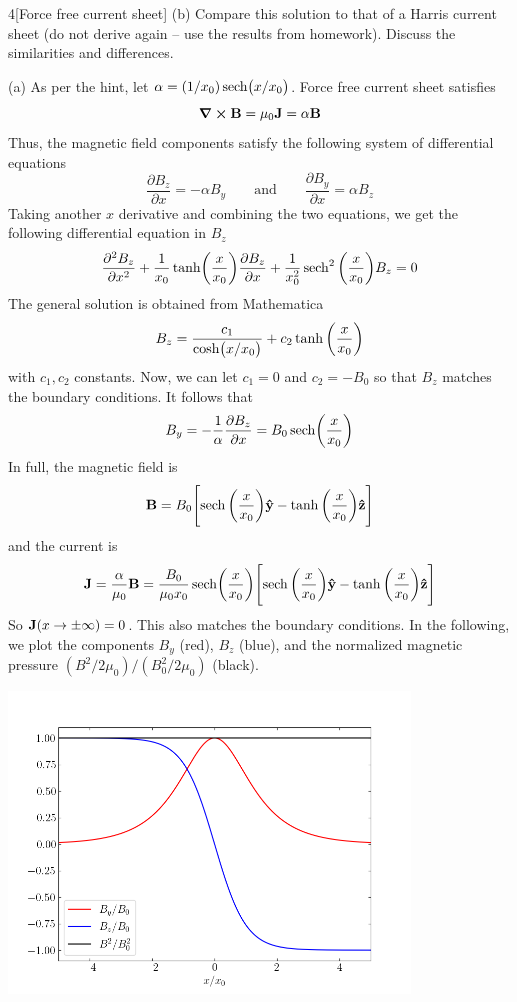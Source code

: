 \documentclass[12pt]{article}
\begin{document}
\begin{problem}{4}[Force free current sheet]
(b) Compare this solution to that of a Harris current sheet (do not derive again
-- use the results from homework). Discuss the similarities and differences.
\begin{solution}
(a) As per the hint, let $\alpha=(1/x_0)\sech(x/x_0)$. Force free current sheet
satisfies
\begin{equation}
    \curl{\vb{B}}=\mu_0\vb{J}=\alpha\vb{B} 
\end{equation}
Thus, the magnetic field components satisfy the following system of differential
equations
\begin{equation}
    \frac{\partial B_z}{\partial x}=-\alpha B_y\qquad\text{and}\qquad
    \frac{\partial B_y}{\partial x}=\alpha B_z
\end{equation}
Taking another $x$ derivative and combining the two equations, we get the
following differential equation in $B_z$
\begin{equation}
    \frac{\partial^2B_z}{\partial
    x^2}+\frac1{x_0}\tanh(\frac{x}{x_0})\frac{\partial B_z}{\partial
x}+\frac1{x_0^2}\sech^2\qty(\frac{x}{x_0})B_z=0 
\end{equation}
The general solution is obtained from Mathematica
\begin{equation}
    B_z=\frac{c_1}{\cosh(x/x_0)}+c_2\tanh\qty(\frac{x}{x_0}) 
\end{equation}
with $c_1,c_2$ constants. Now, we can let $c_1=0$ and $c_2=-B_0$ so that $B_z$
matches the boundary conditions. It follows that
\begin{equation}
    B_y=-\frac1{\alpha}\frac{\partial B_z}{\partial x}=B_0\sech(\frac{x}{x_0}) 
\end{equation}
In full, the magnetic field is
\begin{equation}
    \vb{B}=B_0\qty[\sech\qty(\frac{x}{x_0})\yhat-\tanh\qty(\frac{x}{x_0})\zhat] 
\end{equation}
and the current is
\begin{equation}
    \vb{J}=\frac{\alpha}{\mu_0}\vb{B}=\frac{B_0}{\mu_0x_0}\sech(\frac{x}{x_0})\qty[\sech\qty(\frac{x}{x_0})\yhat-\tanh\qty(\frac{x}{x_0})\zhat] 
\end{equation}
So $\vb{J}(x\to\pm\infty)=0$. This also matches the boundary conditions. In the
following, we plot the components $B_y$ (red), $B_z$ (blue), and the normalized
magnetic pressure $(B^2/2\mu_0)/(B_0^2/2\mu_0)$ (black).
\begin{center}
    \includegraphics[width=0.8\textwidth]{p4.png}

\end{center}
\end{solution}
\end{problem}
\end{document}
